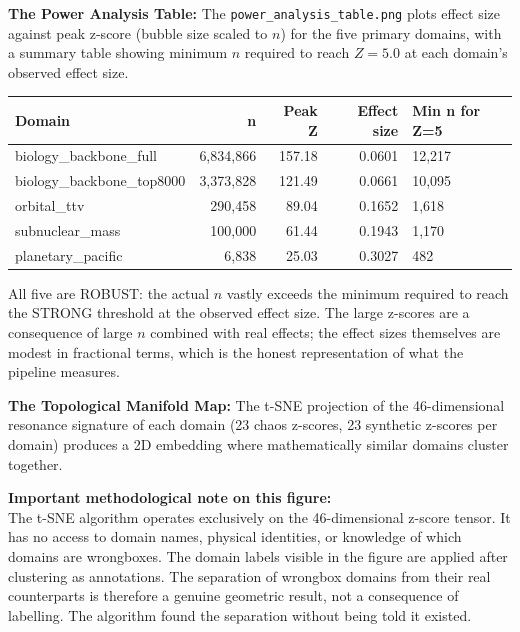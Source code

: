 \documentclass[11pt, letterpaper, openany]{book}
\begin{document}
\begin{empiricalbox}
\textbf{The Power Analysis Table:}
The \texttt{power\_analysis\_table.png} plots effect size against peak z-score
(bubble size scaled to $n$) for the five primary domains, with a summary table
showing minimum $n$ required to reach $Z = 5.0$ at each domain's observed
effect size.

\begin{center}
\small
\begin{tabular}{|l|r|r|r|l|}
\hline
\rowcolor{kishblue!10}
\textbf{Domain} & \textbf{n} & \textbf{Peak Z} & \textbf{Effect size} & \textbf{Min n for Z=5} \\
\hline\hline
biology\_backbone\_full     & 6,834,866 & 157.18 & 0.0601 & 12,217 \\
biology\_backbone\_top8000  & 3,373,828 & 121.49 & 0.0661 & 10,095 \\
orbital\_ttv                & 290,458   & 89.04  & 0.1652 &  1,618 \\
subnuclear\_mass            & 100,000   & 61.44  & 0.1943 &  1,170 \\
planetary\_pacific          & 6,838     & 25.03  & 0.3027 &    482 \\
\hline
\end{tabular}
\end{center}

All five are ROBUST: the actual $n$ vastly exceeds the minimum required to
reach the STRONG threshold at the observed effect size. The large z-scores
are a consequence of large $n$ combined with real effects; the effect sizes
themselves are modest in fractional terms, which is the honest representation
of what the pipeline measures.

\textbf{The Topological Manifold Map:}
The t-SNE projection of the 46-dimensional resonance signature of each domain
(23 chaos z-scores, 23 synthetic z-scores per domain) produces a 2D embedding
where mathematically similar domains cluster together.

\begin{warningbox}
\textbf{Important methodological note on this figure:}\\[0.5em]
The t-SNE algorithm operates exclusively on the 46-dimensional z-score tensor.
It has no access to domain names, physical identities, or knowledge of which
domains are wrongboxes. The domain labels visible in the figure are applied
after clustering as annotations. The separation of wrongbox domains from their
real counterparts is therefore a genuine geometric result, not a consequence
of labelling. The algorithm found the separation without being told it existed.
\end{warningbox}


\end{empiricalbox}
\end{document}
